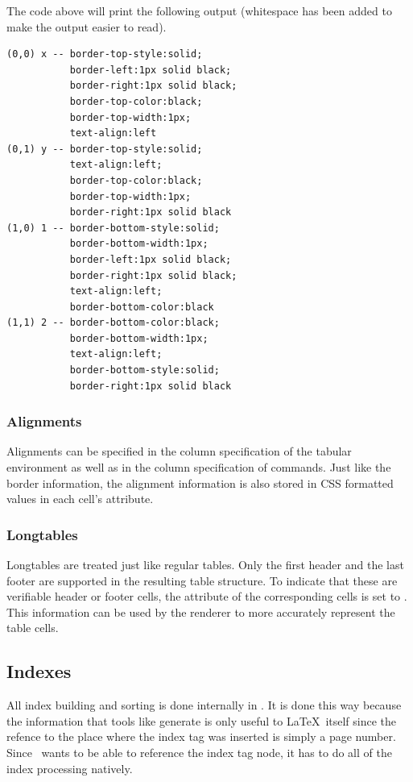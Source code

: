 The code above will print the following output (whitespace has been added
to make the output easier to read).
\begin{verbatim}
(0,0) x -- border-top-style:solid; 
           border-left:1px solid black; 
           border-right:1px solid black; 
           border-top-color:black; 
           border-top-width:1px; 
           text-align:left
(0,1) y -- border-top-style:solid; 
           text-align:left; 
           border-top-color:black; 
           border-top-width:1px; 
           border-right:1px solid black
(1,0) 1 -- border-bottom-style:solid; 
           border-bottom-width:1px; 
           border-left:1px solid black; 
           border-right:1px solid black; 
           text-align:left; 
           border-bottom-color:black
(1,1) 2 -- border-bottom-color:black; 
           border-bottom-width:1px; 
           text-align:left; 
           border-bottom-style:solid; 
           border-right:1px solid black
\end{verbatim}


\subsubsection{Alignments}

Alignments can be specified in the column specification of the tabular 
environment as well as in the column specification of 
commands.  Just like the border information, the alignment information
is also stored in CSS formatted values in each cell's 
attribute.


\subsubsection{Longtables}

Longtables are treated just like regular tables.  Only the first header
and the last footer are supported in the resulting table structure.
To indicate that these are verifiable header or footer cells, the 
 attribute of the corresponding cells is set to 
.  This information can be used by the renderer to more 
accurately represent the table cells.


\subsection{Indexes}

All index building and sorting is done internally in \plasTeX.  It is 
done this way because the information that tools like 
generate is only useful to \LaTeX\ itself since the refence to the 
place where the index tag was inserted is simply a page number.  Since
\plasTeX\ wants to be able to reference the index tag node, it has 
to do all of the index processing natively.


